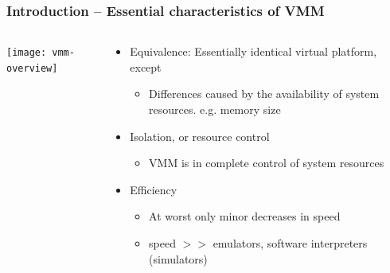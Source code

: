 \begin{frame}[plain]
	\frametitle{Introduction -- Essential characteristics of VMM}
	
	
	
	\begin{columns}
		
		\begin{column}{.5\textwidth}
			
			\texttt{[image: vmm-overview]}
			
		\end{column}
		
		\begin{column}{.5\textwidth}
			
	     \begin{itemize}
			\item Equivalence: Essentially identical virtual platform, except
			\begin{itemize}
				\item Differences caused by the availability of system resources. e.g. memory size

			\end{itemize} \pause
			
			\item Isolation, or resource control 
			\begin{itemize}
				\item VMM is in complete control of system resources
				
			\end{itemize} \pause
			
			\item Efficiency
			\begin{itemize}
				\item At worst only minor decreases in speed
				\item speed $>>$ emulators, software interpreters (simulators)
				
			\end{itemize}
		
     	\end{itemize}	
	
		\end{column}
		
		
	\end{columns}
	
	
\end{frame}

\fi


